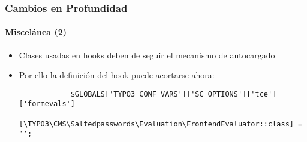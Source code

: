 
\begin{frame}[fragile]
	\frametitle{Cambios en Profundidad}
	\framesubtitle{Miscelánea (2)}

	\lstset{basicstyle=\tiny\ttfamily}

	\begin{itemize}

		\item Clases usadas en hooks deben de seguir el mecanismo de autocargado
		\item Por ello la definición del hook puede acortarse ahora:

		\begin{lstlisting}
			$GLOBALS['TYPO3_CONF_VARS']['SC_OPTIONS']['tce']['formevals']
			  [\TYPO3\CMS\Saltedpasswords\Evaluation\FrontendEvaluator::class] = '';
		\end{lstlisting}

	\end{itemize}

	\breakingchange

\end{frame}

